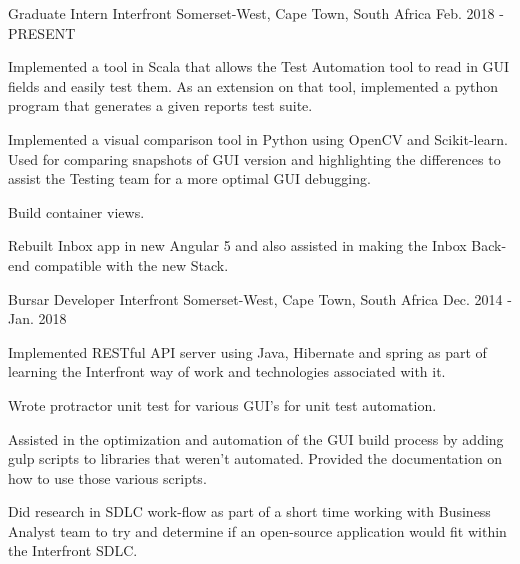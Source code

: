 

\begin{cventries}

  \cventry
    {Graduate Intern} %
    {Interfront} %
    {Somerset-West, Cape Town, South Africa} %
    { Feb. 2018 - PRESENT} %
    {
      \begin{cvitems} %
        \item {Implemented a tool in Scala that allows the Test Automation tool to read in GUI fields and easily test them. As an extension on that tool, implemented a python program that generates a given reports test suite. }
        \item {Implemented a visual comparison tool in Python using OpenCV and Scikit-learn. Used for comparing snapshots of GUI version and highlighting the differences to assist the Testing team for a more optimal GUI debugging.}
         \item {Build container views.}
              \item {Rebuilt Inbox app in new Angular 5 and also assisted in making the Inbox Back-end compatible with the new Stack.}
      \end{cvitems}
    }
  \cventry
    {Bursar Developer} %
    {Interfront} %
    {Somerset-West, Cape Town, South Africa} %
    {Dec. 2014 - Jan. 2018} %
    {
      \begin{cvitems} %
        \item {Implemented RESTful API server using Java, Hibernate and spring as part of learning the Interfront way of work and technologies associated with it.}
        \item {Wrote protractor unit test for various GUI's for unit test automation.}
        \item {Assisted in the optimization and automation of the GUI build process by adding gulp scripts to libraries that weren't automated. Provided the documentation on how to use those various scripts. }
        \item {Did research in SDLC work-flow as part of a short time working with Business Analyst team to try and determine if an open-source application would fit within the Interfront SDLC.}
      \end{cvitems}
    }





\end{cventries}
